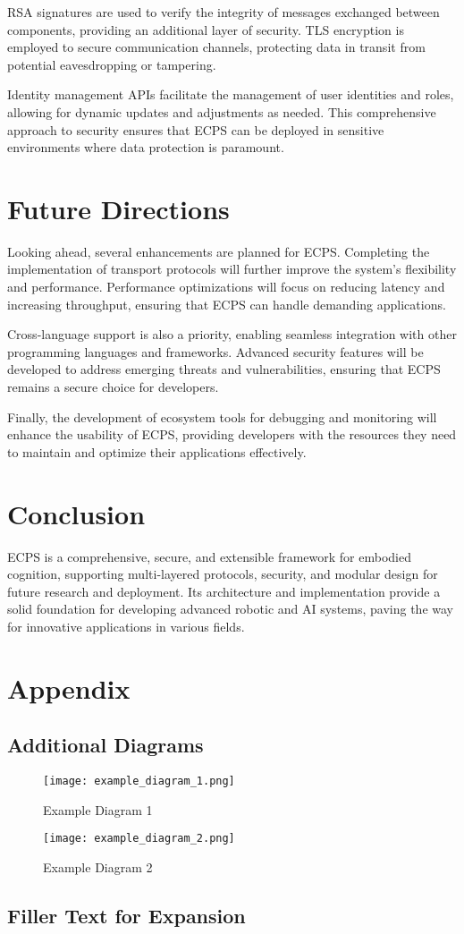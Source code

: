\documentclass[12pt]{article}
\begin{document}
RSA signatures are used to verify the integrity of messages exchanged between components, providing an additional layer of security. TLS encryption is employed to secure communication channels, protecting data in transit from potential eavesdropping or tampering.

Identity management APIs facilitate the management of user identities and roles, allowing for dynamic updates and adjustments as needed. This comprehensive approach to security ensures that ECPS can be deployed in sensitive environments where data protection is paramount.

\section{Future Directions}
Looking ahead, several enhancements are planned for ECPS. Completing the implementation of transport protocols will further improve the system's flexibility and performance. Performance optimizations will focus on reducing latency and increasing throughput, ensuring that ECPS can handle demanding applications.

Cross-language support is also a priority, enabling seamless integration with other programming languages and frameworks. Advanced security features will be developed to address emerging threats and vulnerabilities, ensuring that ECPS remains a secure choice for developers.

Finally, the development of ecosystem tools for debugging and monitoring will enhance the usability of ECPS, providing developers with the resources they need to maintain and optimize their applications effectively.

\section{Conclusion}
ECPS is a comprehensive, secure, and extensible framework for embodied cognition, supporting multi-layered protocols, security, and modular design for future research and deployment. Its architecture and implementation provide a solid foundation for developing advanced robotic and AI systems, paving the way for innovative applications in various fields.

\newpage
\section{Appendix}
\subsection{Additional Diagrams}
\begin{figure}[H]
\centering
\texttt{[image: example\_diagram\_1.png]}
\caption{Example Diagram 1}
\end{figure}

\begin{figure}[H]
\centering
\texttt{[image: example\_diagram\_2.png]}
\caption{Example Diagram 2}
\end{figure}

\subsection{Filler Text for Expansion}
\lipsum[1-20] %
\end{document}
